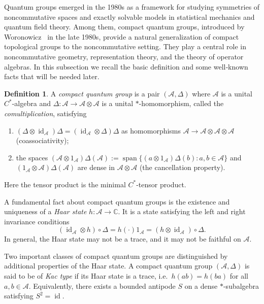 \documentclass[12pt, reqno]{amsart}
\theoremstyle{definition}
\newtheorem{definition}[theorem]{Definition}
\theoremstyle{remark}
\numberwithin{equation}{section}
\begin{document}
Quantum groups emerged in the 1980s as a framework for studying symmetries 
of noncommutative spaces and exactly solvable models in statistical mechanics 
and quantum field theory. Among them, compact quantum groups, introduced by 
Woronowicz~\cite{12} in the late 1980s, provide a natural generalization of 
compact topological groups to the noncommutative setting. They play a central 
role in noncommutative geometry, representation theory, and the theory of 
operator algebras. In this subsection we recall the basic definition and some 
well‑known facts that will be needed later.

\begin{definition}\label{def:compact-quantum-group}
A \emph{compact quantum group} is a pair $(\mathcal{A}, \Delta)$ where 
$\mathcal{A}$ is a unital $C^*$-algebra and 
$\Delta : \mathcal{A} \to \mathcal{A} \otimes \mathcal{A}$ is a unital 
$*$-homomorphism, called the \emph{comultiplication}, satisfying
\begin{enumerate}
    \item $(\Delta \otimes \operatorname{id}_{\mathcal{A}}) \Delta 
          = (\operatorname{id}_{\mathcal{A}} \otimes \Delta) \Delta$ 
          as homomorphisms $\mathcal{A} \to \mathcal{A} \otimes \mathcal{A} 
          \otimes \mathcal{A}$ (coassociativity);
    \item the spaces 
          $(\mathcal{A} \otimes 1_{\mathcal{A}}) \Delta(\mathcal{A}) 
          := \operatorname{span}\{(a \otimes 1_{\mathcal{A}}) \Delta(b) : 
          a, b \in \mathcal{A}\}$ and 
          $(1_{\mathcal{A}} \otimes \mathcal{A}) \Delta(\mathcal{A})$ 
          are dense in $\mathcal{A} \otimes \mathcal{A}$ 
          (the cancellation property).
\end{enumerate}
Here the tensor product is the minimal $C^*$-tensor product.
\end{definition}

A fundamental fact about compact quantum groups is the existence and 
uniqueness of a \emph{Haar state} $h : \mathcal{A} \to \mathbb{C}$. 
It is a state satisfying the left and right invariance conditions
\[
(\operatorname{id}_{\mathcal{A}} \otimes h) \circ \Delta 
= h(\cdot) 1_{\mathcal{A}} 
= (h \otimes \operatorname{id}_{\mathcal{A}}) \circ \Delta.
\]
In general, the Haar state may not be a trace, and it may not be faithful 
on $\mathcal{A}$.

Two important classes of compact quantum groups are distinguished by 
additional properties of the Haar state. A compact quantum group 
$(\mathcal{A}, \Delta)$ is said to be of \emph{Kac type} if its Haar state 
is a trace, i.e.\ $h(ab) = h(ba)$ for all $a,b \in \mathcal{A}$. 
Equivalently, there exists a bounded antipode $S$ on a dense 
$*$-subalgebra satisfying $S^2 = \operatorname{id}$.
\end{document}
